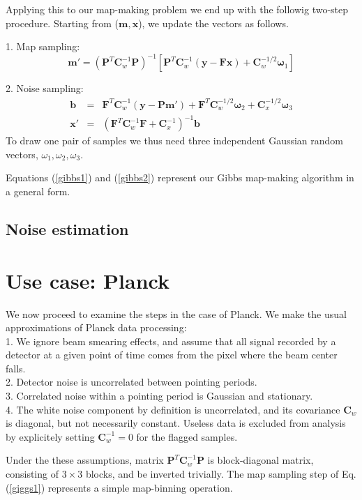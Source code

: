 \documentclass[traditabstract]{aa}
\newcommand{\ve}[1]{{\mathbf #1}}
\newcommand{\ma}[1]{\mathbf{#1}}
\begin{document}
Applying this to our map-making problem we end up with the
followig two-step procedure.
Starting from ($\ve m,\ve x$), we update the vectors as follows.

\parindent=0mm
1. Map sampling:
%
\begin{equation}
\ve m' = (\ma P^T \ma C_w^{-1}\ma P)^{-1} [\ma P^T \ma C_w^{-1} (\ve y-\ma F\ve x) 
+ \ma C_w^{-1/2}\ve\omega_1] \label{gibbs1}
\end{equation} 
%

2. Noise sampling:
%
\begin{eqnarray}
\ve b &=&  \ma F^T \ma C_w^{-1} (\ve y -\ma P\ve m')
        +\ma F^T\ma C_w^{-1/2}\ve\omega_2 
        +\ma C_x^{-1/2}\ve\omega_3   \nonumber \\
\ve x' &=& (\ma F^T \ma C_w^{-1}\ma F +\ma C_x^{-1})^{-1} \ve b \label{gibbs2}
\end{eqnarray}
%
To draw one pair of samples we thus need three independent Gaussian random vectors, 
$\omega_1,\omega_2,\omega_3$.

\parindent=5mm
Equations (\ref{gibbs1}) and (\ref{gibbs2})
represent our Gibbs map-making algorithm in a general form.


\subsection{Noise estimation}




\section{Use case: Planck}

We now proceed to examine the steps in the case of Planck.
We make the usual approximations of Planck data processing: \\
1. We ignore beam smearing effects, and assume that all signal
recorded by a detector at a given point of time comes from the pixel where the beam center falls. \\
2. Detector noise is uncorrelated between pointing periods. \\
3. Correlated noise within a pointing period is Gaussian and stationary.  \\
4. The white noise component by definition is uncorrelated, and its covariance $\ma C_w$ is diagonal,
but not necessarily constant.  Useless data is excluded from analysis by explicitely setting $\ma C_w^{-1}=0$
for the flagged samples.

Under the these assumptions, matrix $\ma P^T\ma C_w^{-1}\ma P$
is block-diagonal matrix, consisting of $3\times3$ blocks,
and be inverted trivially.
The map sampling step of Eq. (\ref{giggs1})
represents a simple map-binning operation.
\end{document}
